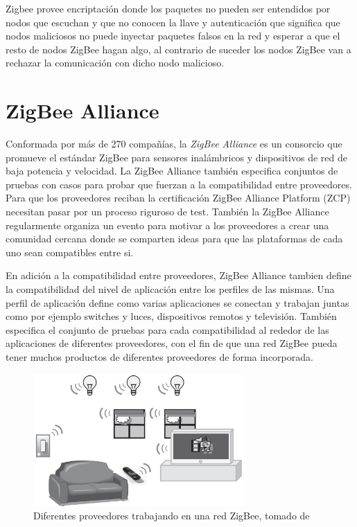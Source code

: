 \documentclass[10pt,journal,compsoc]{IEEEtran}
\begin{document}
Zigbee provee encriptación donde los paquetes no pueden ser entendidos por nodos que escuchan y que no conocen la llave y autenticación que significa que nodos maliciosos no puede inyectar paquetes falsos en la red y esperar a que el resto de nodos ZigBee hagan algo, al contrario de suceder los nodos ZigBee van a rechazar la comunicación con dicho nodo malicioso.

\section{ZigBee Alliance}
  Conformada por más de 270 compañías, la \emph{ZigBee Alliance} es un consorcio que promueve el estándar ZigBee para sensores inalámbricos y dispositivos de red de baja potencia y velocidad. La ZigBee Alliance también especifica conjuntos de pruebas con casos para probar que fuerzan a la compatibilidad entre proveedores. Para que los proveedores reciban la certificación ZigBee Alliance Platform (ZCP) necesitan pasar por un proceso riguroso de test. También la ZigBee Alliance regularmente organiza un evento para motivar a los proveedores a crear una comunidad cercana donde se comparten ideas para que las plataformas de cada uno sean compatibles entre si.
  
  En adición a la compatibilidad entre proveedores, ZigBee Alliance tambien define la compatibilidad del nivel de aplicación entre los perfiles de las mismas. Una perfil de aplicación define como varias aplicaciones se conectan y trabajan juntas como por ejemplo switches y luces, dispositivos remotos y televisión. También especifica el conjunto de pruebas para cada compatibilidad al rededor de las aplicaciones de diferentes proveedores, con el fin de que una red ZigBee pueda tener muchos productos de diferentes proveedores de forma incorporada.
  
\begin{figure}[h]
    \centering
    \includegraphics[width=8cm]{redZigbee}
    \caption{Diferentes proveedores trabajando en una red ZigBee, tomado de \cite{gislason}}
    \label{fig:device-architecture}
\end{figure}
 
\end{document}
